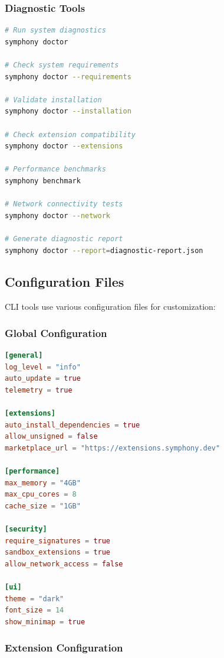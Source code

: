 \subsubsection*{Diagnostic Tools}

\begin{lstlisting}[language=bash,caption={System Diagnostics}]
# Run system diagnostics
symphony doctor

# Check system requirements
symphony doctor --requirements

# Validate installation
symphony doctor --installation

# Check extension compatibility
symphony doctor --extensions

# Performance benchmarks
symphony benchmark

# Network connectivity tests
symphony doctor --network

# Generate diagnostic report
symphony doctor --report=diagnostic-report.json
\end{lstlisting}

\subsection*{Configuration Files}

CLI tools use various configuration files for customization:

\subsubsection*{Global Configuration}

\begin{lstlisting}[language=toml,caption={Global Configuration (symphony.toml)}]
[general]
log_level = "info"
auto_update = true
telemetry = true

[extensions]
auto_install_dependencies = true
allow_unsigned = false
marketplace_url = "https://extensions.symphony.dev"

[performance]
max_memory = "4GB"
max_cpu_cores = 8
cache_size = "1GB"

[security]
require_signatures = true
sandbox_extensions = true
allow_network_access = false

[ui]
theme = "dark"
font_size = 14
show_minimap = true
\end{lstlisting}

\subsubsection*{Extension Configuration}


